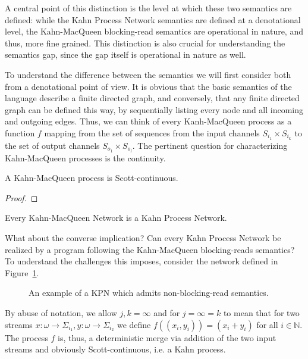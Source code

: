 A central point of this distinction is the level at which these two semantics are defined: while the Kahn Process Network semantics are defined at a denotational level, the Kahn-MacQueen blocking-read semantics are operational in nature, and thus, more fine grained. This distinction is also crucial for understanding the semantics gap, since the gap itself is operational in nature as well. 

To understand the difference between the semantics we will first consider both from a denotational point of view. It is obvious that the basic semantics of the language describe a finite directed graph, and conversely, that any finite directed graph can be defined this way, by sequentially listing every node and all incoming and outgoing edges.
Thus, we can think of every Kanh-MacQueen process as a function $f$ mapping from the set of sequences from the input channels $S_{i_1} \times S_{i_k}$ to the set of output channels $S_{o_1} \times S_{o_l}$.
The pertinent question for characterizing Kahn-MacQueen processes is the continuity. 

\begin{theorem}
\label{thm:macqueen}
A Kahn-MacQueen process is Scott-continuous.
\begin{proof}
\end{proof}
\end{theorem}

\begin{cor}
\label{cor:macqueen}
Every Kahn-MacQueen Network is a Kahn Process Network.
\end{cor}

What about the converse implication? Can every Kahn Process Network be realized by a program following the Kahn-MacQueen blocking-reads semantics?
To understand the challenges this imposes, consider the network defined in Figure~\ref{fig:macqueen_counterexample}.

\begin{figure}[h]
   \resizebox{0.85\textwidth}{!}{}
	\caption{An example of a \ac{KPN} which admits non-blocking-read semantics.}
	\label{fig:macqueen_counterexample}
\end{figure}

By abuse of notation, we allow $j, k = \infty$ and for $j = \infty = k$ to mean that for two streams $x : \omega \rightarrow \Sigma_{i_1}, y : \omega \rightarrow \Sigma_{i_2}$ we define $f((x_i,y_i)) = (x_i+y_i)$ for all $i \in \mathbb{N}$.
The process $f$ is, thus, a deterministic merge via addition of the two input streams and obviously Scott-continuous, i.e. a Kahn process.

